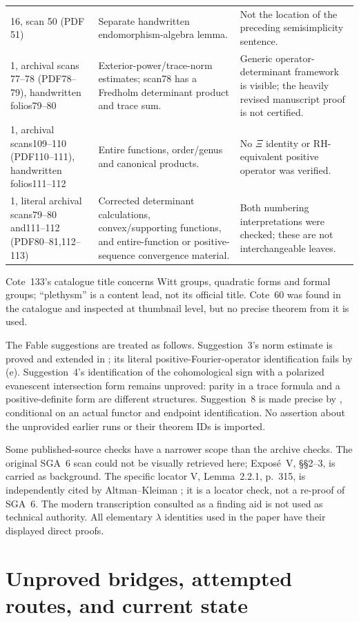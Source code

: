 {\begin{longtable}{p{.19\linewidth}p{.36\linewidth}p{.37\linewidth}}
16, scan 50 (PDF 51)&Separate handwritten endomorphism-algebra lemma.&Not the location of the preceding semisimplicity sentence.\\
1, archival scans 77--78 (PDF78--79), handwritten folios79--80&Exterior-power/trace-norm estimates; scan78 has a Fredholm determinant product and trace sum.&Generic operator-determinant framework is visible; the heavily revised manuscript proof is not certified.\\
1, archival scans109--110 (PDF110--111), handwritten folios111--112&Entire functions, order/genus and canonical products.&No $\Xi$ identity or RH-equivalent positive operator was verified.\\
1, literal archival scans79--80 and111--112 (PDF80--81,112--113)&Corrected determinant calculations, convex/supporting functions, and entire-function or positive-sequence convergence material.&Both numbering interpretations were checked; these are not interchangeable leaves.\\\bottomrule
\end{longtable}}
Cote~133's catalogue title concerns Witt groups, quadratic forms and formal groups; ``plethysm'' is a content lead, not its official title. Cote~60 was found in the catalogue and inspected at thumbnail level, but no precise theorem from it is used.

The Fable suggestions are treated as follows. Suggestion~3's norm estimate is proved and extended in ; its literal positive-Fourier-operator identification fails by (e). Suggestion~4's identification of the cohomological sign with a polarized evanescent intersection form remains unproved: parity in a trace formula and a positive-definite form are different structures. Suggestion~8 is made precise by , conditional on an actual functor and endpoint identification. No assertion about the unprovided earlier runs or their theorem IDs is imported.

Some published-source checks have a narrower scope than the archive checks. The original SGA~6 scan could not be visually retrieved here; Expos\'e~V, \S\S2--3, is carried as background. The specific locator V, Lemma~2.2.1, p.~315, is independently cited by Altman--Kleiman \cite[\S2.10]{AK}; it is a locator check, not a re-proof of SGA~6. The modern transcription consulted as a finding aid is not used as technical authority. All elementary $\lambda$ identities used in the paper have their displayed direct proofs.

\part{Unproved bridges, attempted routes, and current state}
